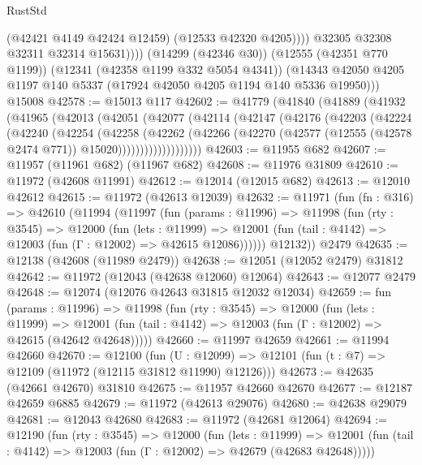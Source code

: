 \begin{lexlean}{RustStd}
\begin{coremodule}
                    (@42421 @4149 @42424 @12459)
                    (@12533 @42320 @4205))))
              @32305
              @32308
              @32311
              @32314
              @15631))))
      (@14299 (@42346 @30))
      (@12555 (@42351 @770 @1199))
      (@12341 (@42358 @1199 @332 @5054 @4341))
      (@14343 @42050 @4205 @1197 @140 @5337 (@17924 @42050 @4205 @1194 @140 @5336 @19950)))
    @15008
@42578 := @15013 @117
@42602 := @41779
    (@41840
      (@41889
        (@41932
          (@41965
            (@42013
              (@42051
                (@42077
                  (@42114
                    (@42147
                      (@42176
                        (@42203
                          (@42224
                            (@42240
                              (@42254
                                (@42258
                                  (@42262
                                    (@42266
                                      (@42270
                                        (@42577
                                          (@12555 (@42578 @2474 @771))
                                          @15020)))))))))))))))))))
@42603 := @11955 @682
@42607 := @11957 (@11961 @682) (@11967 @682)
@42608 := @11976 @31809
@42610 := @11972 (@42608 @11991)
@42612 := @12014 (@12015 @682)
@42613 := @12010 @42612
@42615 := @11972 (@42613 @12039)
@42632 := @11971
    (fun (fn : @316) =>
    @42610
      (@11994
        (@11997
          (fun (params : @11996) =>
          @11998
            (fun (rty : @3545) =>
            @12000
              (fun (lets : @11999) =>
              @12001 (fun (tail : @4142) => @12003 (fun (Γ : @12002) => @42615 @12086))))))
        @12132))
    @2479
@42635 := @12138 (@42608 (@11989 @2479))
@42638 := @12051 (@12052 @2479) @31812
@42642 := @11972 (@12043 (@42638 @12060) @12064)
@42643 := @12077 @2479
@42648 := @12074 (@12076 @42643 @31815 @12032 @12034)
@42659 := fun (params : @11996) =>
  @11998
    (fun (rty : @3545) =>
    @12000
      (fun (lets : @11999) =>
      @12001 (fun (tail : @4142) => @12003 (fun (Γ : @12002) => @42615 (@42642 @42648)))))
@42660 := @11997 @42659
@42661 := @11994 @42660
@42670 := @12100
    (fun (U : @12099) => @12101 (fun (t : @7) => @12109 (@11972 (@12115 @31812 @11990) @12126)))
@42673 := @42635 (@42661 @42670) @31810
@42675 := @11957 @42660 @42670
@42677 := @12187 @42659 @6885
@42679 := @11972 (@42613 @29076)
@42680 := @42638 @29079
@42681 := @12043 @42680
@42683 := @11972 (@42681 @12064)
@42694 := @12190
    (fun (rty : @3545) =>
    @12000
      (fun (lets : @11999) =>
      @12001 (fun (tail : @4142) => @12003 (fun (Γ : @12002) => @42679 (@42683 @42648)))))

\end{coremodule}
\end{lexlean}

